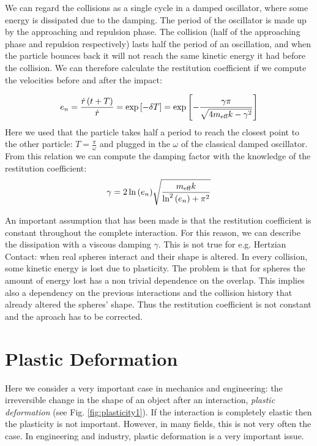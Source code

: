 We can regard the collisions as a single cycle in a damped oscillator, where some energy is dissipated due to the damping. The period of the oscillator is made up by the approaching and repulsion phase. The collision (half of the approaching phase and repulsion respectively) lasts half the period of an oscillation, and when the particle bounces back it will not reach the same kinetic energy it had before the collision. We can therefore calculate the restitution coefficient if we compute the velocities before and after the impact:

\begin{equation}
 e_n = \frac{\dot{r}\left(t+T\right)}{\dot{r}} = \exp\left[-\delta T\right] = \exp\left[- \frac{\gamma \pi}{\sqrt{  4 m_\text{eff} k - \gamma^2  }}\right] 
\end{equation}
Here we used that the particle takes half a period  to reach the closest point to the other particle: $T= \frac{\pi}{\omega}$ and plugged in the $\omega$ of the classical damped oscillator. From this relation we can compute the damping factor with the knowledge of the restitution coefficient:
\begin{equation}
\gamma = 2 \ln{\ensuremath{\left(e_n\right)}} \sqrt{\frac{m_{\text{eff}}k}{\text{ln}^2\left(e_n\right)+\pi^2}}
\end{equation}


An important assumption that has been made is that the restitution coefficient is constant throughout the complete interaction. For this reason, we can describe the dissipation with a viscous damping $\gamma$. This is not true for e.g. Hertzian Contact: when real spheres interact and their shape is altered. In every collision, some kinetic energy  is lost due to plasticity. The problem is that for spheres the amount of energy lost has a non trivial dependence on  the overlap. This implies also a dependency on the previous interactions and the collision history that already altered the spheres' shape. Thus the restitution coefficient is not constant and the aproach has to be corrected.






\section{Plastic Deformation}

Here we consider a very important case in mechanics and engineering: the irreversible change in the shape of an object after an interaction, \emph{plastic deformation} (see Fig. \ref{fig:plasticity1}). If the interaction is completely elastic then the plasticity is not important. However, in many fields, this is not very often the case. In engineering and industry, plastic deformation is a very important issue. 


